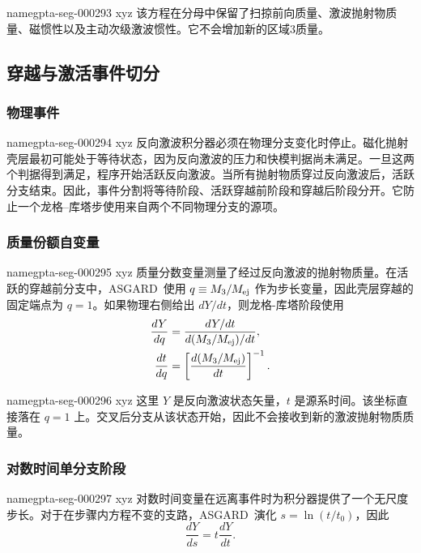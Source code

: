 \documentclass[twocolumn]{aastex702}
\makeatletter
\newcommand{\asgard}{\textsc{ASGARD}}
\providecommand{\gptareaderanchor}[1]{\pdfdest name{#1} xyz}%
\providecommand{\gptareaderanchor}[1]{\special{pdf:dest (#1) [ @thispage /XYZ @xpos @ypos null ]}}%
\makeatother
\begin{document}
\gptareaderanchor{gpta-seg-000293}%
该方程在分母中保留了扫掠前向质量、激波抛射物质量、磁惯性以及主动次级激波惯性。它不会增加新的区域3质量。

\subsection{穿越与激活事件切分}

\subsubsection{物理事件}


\gptareaderanchor{gpta-seg-000294}%
反向激波积分器必须在物理分支变化时停止。磁化抛射壳层最初可能处于等待状态，因为反向激波的压力和快模判据尚未满足。一旦这两个判据得到满足，程序开始活跃反向激波。当所有抛射物质穿过反向激波后，活跃分支结束。因此，事件分割将等待阶段、活跃穿越前阶段和穿越后阶段分开。它防止一个龙格--库塔步使用来自两个不同物理分支的源项。

\subsubsection{质量份额自变量}


\gptareaderanchor{gpta-seg-000295}%
质量分数变量测量了经过反向激波的抛射物质量。在活跃的穿越前分支中，\asgard\ 使用 \(q\equiv M_3/M_{\rm ej}\) 作为步长变量，因此壳层穿越的固定端点为 \(q=1\)。如果物理右侧给出 \(dY/dt\)，则龙格-库塔阶段使用
\begin{equation}
\begin{aligned}
\frac{dY}{dq}
&=\frac{dY/dt}{d(M_3/M_{\rm ej})/dt},\\
\frac{dt}{dq}
&=\left[\frac{d(M_3/M_{\rm ej})}{dt}\right]^{-1}.
\end{aligned}
\end{equation}

\gptareaderanchor{gpta-seg-000296}%
这里 \(Y\) 是反向激波状态矢量，\(t\) 是源系时间。该坐标直接落在 \(q=1\) 上。交叉后分支从该状态开始，因此不会接收到新的激波抛射物质质量。

\subsubsection{对数时间单分支阶段}


\gptareaderanchor{gpta-seg-000297}%
对数时间变量在远离事件时为积分器提供了一个无尺度步长。对于在步骤内方程不变的支路，\asgard\ 演化 \(s=\ln(t/t_0)\)，因此
\begin{equation}
\frac{dY}{ds}=t\frac{dY}{dt}.
\end{equation}
\end{document}
